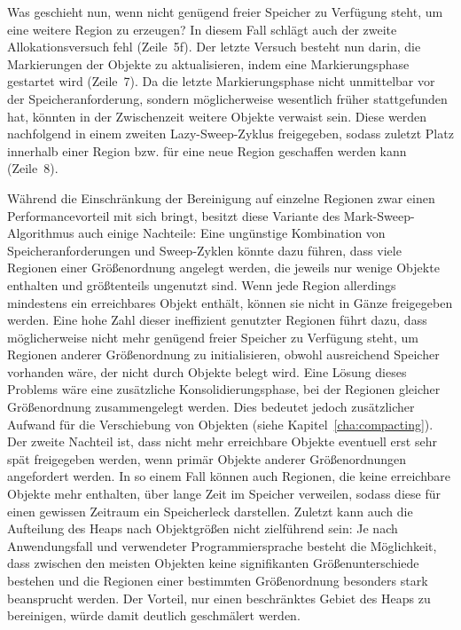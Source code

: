 Was geschieht nun, wenn nicht genügend freier Speicher zu Verfügung steht, um eine weitere Region zu erzeugen?
In diesem Fall schlägt auch der zweite Allokationsversuch fehl (Zeile~5f).
Der letzte Versuch besteht nun darin, die Markierungen der Objekte zu aktualisieren, indem eine Markierungsphase gestartet wird (Zeile~7).
Da die letzte Markierungsphase nicht unmittelbar vor der Speicheranforderung, sondern möglicherweise wesentlich früher stattgefunden hat, könnten in der Zwischenzeit weitere Objekte verwaist sein.
Diese werden nachfolgend in einem zweiten Lazy-Sweep-Zyklus freigegeben, sodass zuletzt Platz innerhalb einer Region bzw. für eine neue Region geschaffen werden kann (Zeile~8).

Während die Einschränkung der Bereinigung auf einzelne Regionen zwar einen Performancevorteil mit sich bringt, besitzt diese Variante des Mark-Sweep-Algorithmus auch einige Nachteile:
Eine ungünstige Kombination von Speicheranforderungen und Sweep-Zyklen könnte dazu führen, dass viele Regionen einer Größenordnung angelegt werden, die jeweils nur wenige Objekte enthalten und größtenteils ungenutzt sind.
Wenn jede Region allerdings mindestens ein erreichbares Objekt enthält, können sie nicht in Gänze freigegeben werden.
Eine hohe Zahl dieser ineffizient genutzter Regionen führt dazu, dass möglicherweise nicht mehr genügend freier Speicher zu Verfügung steht, um Regionen anderer Größenordnung zu initialisieren, obwohl ausreichend Speicher vorhanden wäre, der nicht durch Objekte belegt wird.
Eine Lösung dieses Problems wäre eine zusätzliche Konsolidierungsphase, bei der Regionen gleicher Größenordnung zusammengelegt werden.
Dies bedeutet jedoch zusätzlicher Aufwand für die Verschiebung von Objekten (siehe Kapitel~\ref{cha:compacting}).
Der zweite Nachteil ist, dass nicht mehr erreichbare Objekte eventuell erst sehr spät freigegeben werden, wenn primär Objekte anderer Größenordnungen angefordert werden.
In so einem Fall können auch Regionen, die keine erreichbare Objekte mehr enthalten, über lange Zeit im Speicher verweilen, sodass diese für einen gewissen Zeitraum ein Speicherleck darstellen.
Zuletzt kann auch die Aufteilung des Heaps nach Objektgrößen nicht zielführend sein:
Je nach Anwendungsfall und verwendeter Programmiersprache besteht die Möglichkeit, dass zwischen den meisten Objekten keine signifikanten Größenunterschiede bestehen und die Regionen einer bestimmten Größenordnung besonders stark beansprucht werden.
Der Vorteil, nur einen beschränktes Gebiet des Heaps zu bereinigen, würde damit deutlich geschmälert werden.


